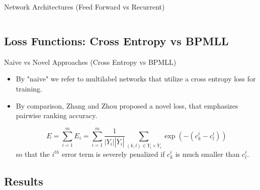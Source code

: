 \documentclass{beamer}
\makeatletter
\newenvironment{myitemize}{%
   \setlength{\topsep}{0pt}
   \setlength{\partopsep}{0pt}
   \renewcommand*{\@listi}{\leftmargin\leftmargini \parsep\z@ \topsep\z@ \itemsep\z@}
   \let\@listI\@listi
   \itemize
}{\enditemize}
\makeatother
\begin{document}
\begin{frame}[t]{Network Architectures (Feed Forward vs Recurrent)}
\begin{columns}[t]
    \end{columns}
\end{frame}

\subsection{Loss Functions: Cross Entropy vs BPMLL}

\begin{frame}[t]{Naive vs Novel Approaches (Cross Entropy vs BPMLL)}
    \begin{itemize}
        \item 
        By "naive" we refer to multilabel networks that utilize a cross entropy loss for training.
        
        \item
        By comparison, Zhang and Zhou \autocite{bpmll} proposed a novel loss, that emphasizes pairwise ranking accuracy.
        
        $$
            E = \sum_{i = 1}^m E_i = \sum_{i = 1}^m \frac{1}{|Y_i| |\overline{Y}_i|} \sum_{(k,l) \in Y_i \times \overline{Y}_i} \exp(-(c_k^i - c_l^i))
        $$
        so that the $i^{th}$ error term is severely penalized if $c_k^i$ is much smaller than $c_l^i$.
    \end{itemize}
\end{frame}

\subsection{Results}
\end{document}
